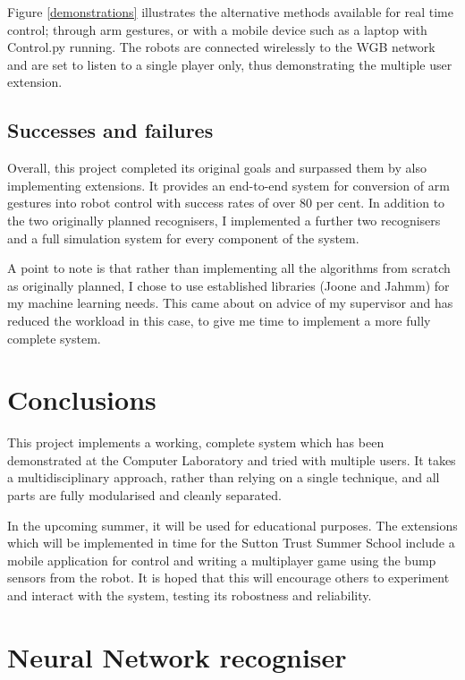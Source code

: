 \documentclass[12pt,a4,notitlepage]{report}
\renewcommand{\_}{\texttt{\symbol{95}}}
\newcommand{\<}{\texttt{\symbol{60}}}
\renewcommand{\>}{\texttt{\symbol{62}}}
\begin{document}
Figure \ref{demonstrations} illustrates the alternative methods available for real time control; through arm gestures, or with a mobile device such as a laptop with Control.py running. The robots are connected wirelessly to the WGB network and are set to listen to a single player only, thus demonstrating the multiple user extension.

\section{Successes and failures}

Overall, this project completed its original goals and surpassed them by also implementing extensions. It provides an end-to-end system for conversion of arm gestures into robot control with success rates of over 80 per cent. In addition to the two originally planned recognisers, I implemented a further two recognisers and a full simulation system for every component of the system.

A point to note is that rather than implementing all the algorithms from scratch as originally planned, I chose to use established libraries (Joone and Jahmm) for my machine learning needs. This came about on advice of my supervisor and has reduced the workload in this case, to give me time to implement a more fully complete system.

\chapter{Conclusions}

This project implements a working, complete system which has been demonstrated at the Computer Laboratory and tried with multiple users. It takes a multidisciplinary approach, rather than relying on a single technique, and all parts are fully modularised and cleanly separated.

In the upcoming summer, it will be used for educational purposes. The extensions which will be implemented in time for the Sutton Trust Summer School include a mobile application for control and writing a multiplayer game using the bump sensors from the robot. It is hoped that this will encourage others to experiment and interact with the system, testing its robostness and reliability.



\appendix

\chapter{Neural Network recogniser}
\end{document}
